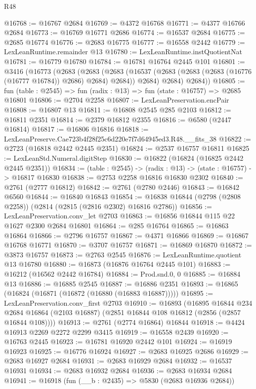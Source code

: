 \begin{lexlean}{R48}
\begin{coremodule}
@16768 := @16767 @2684
@16769 := @4372 @16768
@16771 := @4377 @16766 @2684
@16773 := @16769 @16771 @2686
@16774 := @16537 @2684
@16775 := @2685 @16774
@16776 := @2683 @16775
@16777 := @16558 @2442
@16779 := LexLeanRuntime.remainder @13
@16780 := LexLeanRuntime.instQuotientNat
@16781 := @16779 @16780
@16784 := @16781 @16764 @2445 @101
@16801 := @3416
    (@16773
      (@2683
        (@2683
          (@2683 (@16537 (@2683 (@2683 (@2683 (@16776 (@16777 @16784)) @2686) @2684) @2684)) @2684)
          @2684)
        @2684))
@16805 := fun (table : @2545) => fun (radix : @13) => fun (state : @16757) => @2685 @16801
@16806 := @2704 @2258
@16807 := LexLeanPreservation.encPair
@16808 := @16807 @13
@16811 := @16808 @2545 @285 @2103
@16812 := @16811 @2351
@16814 := @2379 @16812 @2355
@16816 := @6580 (@2447 @16814)
@16817 := @16806 @16816
@16818 := LexLeanPreserve.Cae723b4f28f25c6d220e7f7d64945ed3.R48.__fits_38
@16822 := @2723 (@16818 @2442 @2445 @2351)
@16824 := @2537 @16757 @16811
@16825 := LexLeanStd.Numeral.digitStep
@16830 := @16822 (@16824 (@16825 @2442 @2445 @2351))
@16834 := (table : @2545) -> (radix : @13) -> (state : @16757) -> @16817 @16830
@16838 := @2753 @2258 @16816 @16830 @2302
@16840 := @2761 (@2777 @16812)
@16842 := @2761 (@2780 @2446)
@16843 := @16842 @6560
@16844 := @16840 @16843
@16854 := @16838 @16844 (@2798 (@2808 @2258)) (@2814 (@2815 (@2816 @2302) @16816 @2786))
@16856 := LexLeanPreservation.conv_let @2703
@16863 := @16856 @16844 @115 @22 @1627 @2300 @2684 @16801
@16864 := @285 @16764
@16865 := @16863 @16864
@16866 := @2796 @16757
@16867 := @4371 @16866
@16869 := @16867 @16768 @16771
@16870 := @3707 @16757
@16871 := @16869 @16870
@16872 := @3873 @16757
@16873 := @2763 @2545
@16876 := LexLeanRuntime.quotient @13 @16780
@16880 := @16873 (@16876 @16764 @2445 @101)
@16883 := @16212 (@16562 @2442 @16784)
@16884 := Prod.snd.{0, 0}
@16885 := @16884 @13
@16886 := @16885 @2545
@16887 := @16886 @2351
@16893 := @16865 (@16824 (@16871 (@16872 (@16880 (@16883 @16887)))))
@16895 := LexLeanPreservation.conv_first @2703
@16910 := @16893
    (@16895
      @16844
      @234
      @2684
      @16864
      (@2103 @16887)
      (@2851 @16844 @108 @16812 (@2856 (@2857 @16844 @108))))
@16913 := @2761 (@2774 @16864) @16844
@16918 := @4424 @16913 @2269 @2272 @2299 @3415
@16919 := @16558 @2439
@16920 := @16763 @2445
@16923 := @16781 @16920 @2442 @101
@16924 := @16919 @16923
@16925 := @16776 @16924
@16927 := @2683 @16925 @2686
@16929 := @2683 @16927 @2684
@16931 := @2683 @16929 @2684
@16932 := @16537 @16931
@16934 := @2683 @16932 @2684
@16936 := @2683 @16934 @2684
@16941 := @16918 (fun (__b : @2435) => @5830 (@2683 @16936 @2684))

\end{coremodule}
\end{lexlean}
